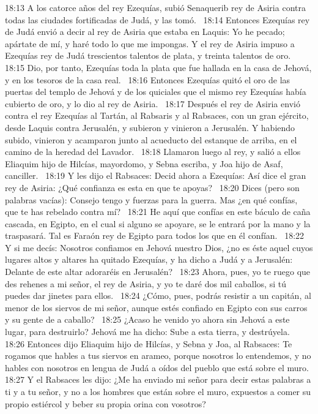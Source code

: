 18:13 A los catorce años del rey Ezequías, subió Senaquerib rey de Asiria contra todas las ciudades fortificadas de Judá, y las tomó.  
18:14 Entonces Ezequías rey de Judá envió a decir al rey de Asiria que estaba en Laquis: Yo he pecado; apártate de mí, y haré todo lo que me impongas. Y el rey de Asiria impuso a Ezequías rey de Judá trescientos talentos de plata, y treinta talentos de oro.  
18:15 Dio, por tanto, Ezequías toda la plata que fue hallada en la casa de Jehová, y en los tesoros de la casa real.  
18:16 Entonces Ezequías quitó el oro de las puertas del templo de Jehová y de los quiciales que el mismo rey Ezequías había cubierto de oro, y lo dio al rey de Asiria.  
18:17 Después el rey de Asiria envió contra el rey Ezequías al Tartán, al Rabsaris y al Rabsaces, con un gran ejército, desde Laquis contra Jerusalén, y subieron y vinieron a Jerusalén. Y habiendo subido, vinieron y acamparon junto al acueducto del estanque de arriba, en el camino de la heredad del Lavador.  
18:18 Llamaron luego al rey, y salió a ellos Eliaquim hijo de Hilcías, mayordomo, y Sebna escriba, y Joa hijo de Asaf, canciller.  
18:19 Y les dijo el Rabsaces: Decid ahora a Ezequías: Así dice el gran rey de Asiria: ¿Qué confianza es esta en que te apoyas?  
18:20 Dices (pero son palabras vacías): Consejo tengo y fuerzas para la guerra. Mas ¿en qué confías, que te has rebelado contra mí?  
18:21 He aquí que confías en este báculo de caña cascada, en Egipto, en el cual si alguno se apoyare, se le entrará por la mano y la traspasará. Tal es Faraón rey de Egipto para todos los que en él confían.  
18:22 Y si me decís: Nosotros confiamos en Jehová nuestro Dios, ¿no es éste aquel cuyos lugares altos y altares ha quitado Ezequías, y ha dicho a Judá y a Jerusalén: Delante de este altar adoraréis en Jerusalén?  
18:23 Ahora, pues, yo te ruego que des rehenes a mi señor, el rey de Asiria, y yo te daré dos mil caballos, si tú puedes dar jinetes para ellos.  
18:24 ¿Cómo, pues, podrás resistir a un capitán, al menor de los siervos de mi señor, aunque estés confiado en Egipto con sus carros y su gente de a caballo?  
18:25 ¿Acaso he venido yo ahora sin Jehová a este lugar, para destruirlo? Jehová me ha dicho: Sube a esta tierra, y destrúyela.  
18:26 Entonces dijo Eliaquim hijo de Hilcías, y Sebna y Joa, al Rabsaces: Te rogamos que hables a tus siervos en arameo, porque nosotros lo entendemos, y no hables con nosotros en lengua de Judá a oídos del pueblo que está sobre el muro.  
18:27 Y el Rabsaces les dijo: ¿Me ha enviado mi señor para decir estas palabras a ti y a tu señor, y no a los hombres que están sobre el muro, expuestos a comer su propio estiércol y beber su propia orina con vosotros?  
